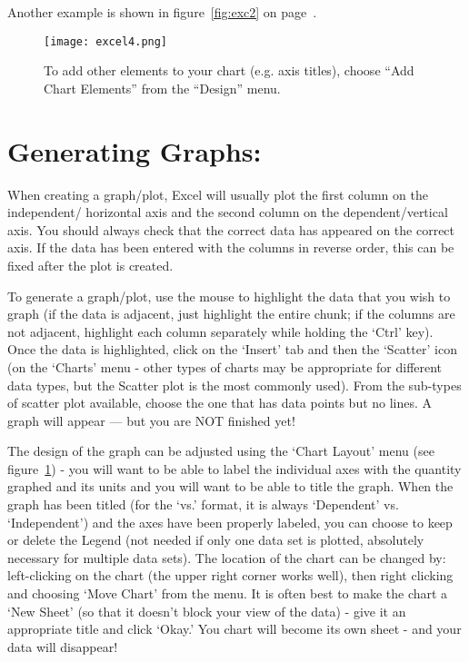 Another example is shown in figure~\ref{fig:exc2} on page~\pageref{fig:exc2}.

\begin{figure}[ht]
\texttt{[image: excel4.png]}
\centering
\caption{To add other elements to your chart (e.g. axis titles), choose ``Add Chart Elements'' from the ``Design'' menu.}
\label{fig:exc4}
\end{figure}

\section*{Generating Graphs:}
When creating a graph/plot, Excel will usually plot the first column on the independent/ horizontal axis and the second column on the dependent/vertical axis. 
You should always check that the correct data has appeared on the correct axis. 
If the data has been entered with the columns in reverse order, this can be fixed after the plot is created.
\par
To generate a graph/plot, use the mouse to highlight the data that you wish to graph (if the data is adjacent, just highlight the entire chunk; if the columns are not adjacent, highlight each column separately while holding the `Ctrl' key). 
Once the data is highlighted, click on the `Insert' tab and then the `Scatter' icon (on the `Charts' menu - other types of charts may be appropriate for different data types, but the Scatter plot is the most commonly used). 
From the sub-types of scatter plot available, choose the one that has data points but no lines. 
A graph will appear — but you are NOT finished yet!
\par
The design of the graph can be adjusted using the `Chart Layout' menu (see figure~\ref{fig:exc4}) - you will want to be able to label the individual axes with the quantity graphed and its units and you will want to be able to title the graph. 
When the graph has been titled (for the `vs.' format, it is always `Dependent' vs. `Independent') and the axes have been properly labeled, you can choose to keep or delete the Legend (not needed if only one data set is plotted, absolutely necessary for multiple data sets). 
The location of the chart can be changed by: left-clicking on the chart (the upper right corner works well), then right clicking and choosing `Move Chart' from the menu. 
It is often best to make the chart a `New Sheet' (so that it doesn't block your view of the data) - give it an appropriate title and click `Okay.' 
You chart will become its own sheet - and your data will disappear! 
